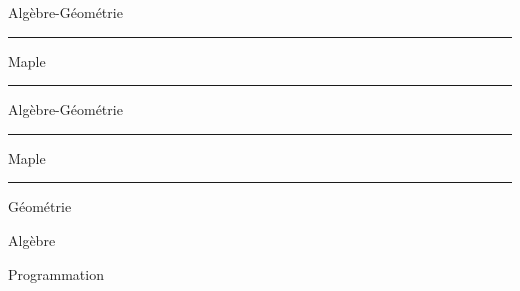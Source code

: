 
\centerline{\seventeenbf  Alg\`ebre-G\'eom\'etrie}
\hrule
\medskip
{}
\medskip
\centerline{\twelvebf Maple}
\medskip
{}
\medskip
\hrule


\vfill


\centerline{\seventeenbf  Alg\`ebre-G\'eom\'etrie}
\hrule
\medskip
{}
\medskip
\centerline{\twelvebf Maple}
\medskip

\medskip
\hrule
\bye


\bigskip
{}

\bigskip
{}

\bigskip
{}

\bigskip
{}

\bigskip
Géométrie

\bigskip
{}

\bigskip
{}

\bigskip
{}

\bigskip
{}



Algèbre
\bigskip
{}


\bigskip
{}

Programmation
\bigskip
{}

\bye